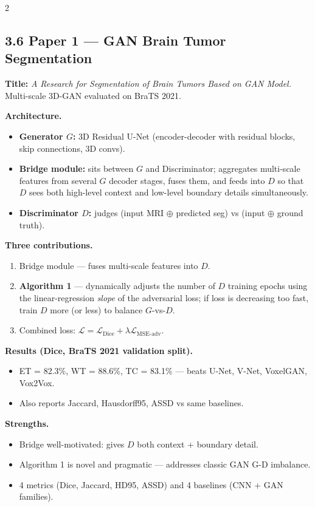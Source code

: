 \begin{paracol}{2}
\switchcolumn*

\subsection*{3.6 Paper 1 — GAN Brain Tumor Segmentation}
\textbf{Title:} \emph{A Research for Segmentation of Brain Tumors Based on GAN Model.} Multi-scale 3D-GAN evaluated on BraTS 2021.

\textbf{Architecture.}
\begin{itemize}[leftmargin=*,nosep]
  \item \textbf{Generator $G$:} 3D Residual U-Net (encoder-decoder with residual blocks, skip connections, 3D convs).
  \item \textbf{Bridge module:} sits between $G$ and Discriminator; aggregates multi-scale features from several $G$ decoder stages, fuses them, and feeds into $D$ so that $D$ sees both high-level context and low-level boundary details simultaneously.
  \item \textbf{Discriminator $D$:} judges (input MRI $\oplus$ predicted seg) vs (input $\oplus$ ground truth).
\end{itemize}

\textbf{Three contributions.}
\begin{enumerate}[leftmargin=*,nosep]
  \item Bridge module — fuses multi-scale features into $D$.
  \item \textbf{Algorithm 1} — dynamically adjusts the number of $D$ training epochs using the linear-regression \emph{slope} of the adversarial loss; if loss is decreasing too fast, train $D$ more (or less) to balance $G$-vs-$D$.
  \item Combined loss: $\mathcal L=\mathcal L_{\text{Dice}}+\lambda \mathcal L_{\text{MSE-adv}}$.
\end{enumerate}

\textbf{Results (Dice, BraTS 2021 validation split).}
\begin{itemize}[leftmargin=*,nosep]
  \item ET = 82.3\%, WT = 88.6\%, TC = 83.1\% — beats U-Net, V-Net, VoxelGAN, Vox2Vox.
  \item Also reports Jaccard, Hausdorff95, ASSD vs same baselines.
\end{itemize}

\textbf{Strengths.}
\begin{itemize}[leftmargin=*,nosep]
  \item Bridge well-motivated: gives $D$ both context + boundary detail.
  \item Algorithm 1 is novel and pragmatic — addresses classic GAN G-D imbalance.
  \item 4 metrics (Dice, Jaccard, HD95, ASSD) and 4 baselines (CNN + GAN families).
\end{itemize}


\end{paracol}
